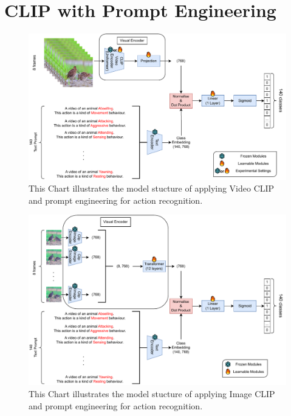 \section{CLIP with Prompt Engineering}
\begin{figure}[ht]
    \centering
    \includegraphics[width=1.0\textwidth]{assets/imgs/3_1_ModelStructureVC}
    \caption[CLIP Action Recognition Model Stucture 1]{This Chart illustrates the model stucture of applying Video CLIP and prompt engineering for action recognition.}
    \label{fig:modelstructic1}
\end{figure}

\begin{figure}[ht]
    \centering
    \includegraphics[width=1.0\textwidth]{assets/imgs/3_2_ModelStructureIC}
    \caption[CLIP Action Recognition Model Stucture 2]{This Chart illustrates the model stucture of applying Image CLIP and prompt engineering for action recognition.}
    \label{fig:modelstructic2}
\end{figure}

